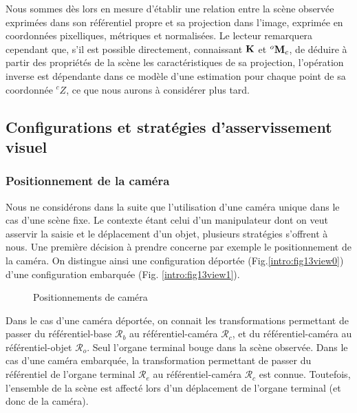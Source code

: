 Nous sommes dès lors en mesure d'établir une relation entre la scène observée 
exprimées dans son référentiel propre et sa projection dans l'image, exprimée 
en 
coordonnées pixelliques, métriques et normalisées. Le lecteur 
remarquera cependant que, s'il est possible directement, connaissant ${\bf K}$ 
et ${}^o{\bf M}_c$, de déduire à partir des propriétés de la scène les 
caractéristiques de sa projection, l'opération inverse est dépendante dans ce 
modèle d'une estimation pour chaque point de sa coordonnée ${}^cZ$, ce que nous 
aurons à considérer plus tard.

\subsection{Configurations et stratégies d'asservissement visuel} 
\label{chap0-3-1}

\subsubsection{Positionnement de la caméra} \label{chap0-3-1-0}

Nous ne considérons dans la suite que l'utilisation d'une caméra unique dans le 
cas d'une scène fixe. Le contexte étant celui d'un manipulateur dont on veut 
asservir la saisie et le déplacement d'un objet, plusieurs stratégies s'offrent 
à nous. Une première décision à prendre concerne par exemple le positionnement 
de la caméra. On distingue ainsi une configuration déportée 
(Fig.\ref{intro:fig13view0}) d'une configuration embarquée (Fig. 
\ref{intro:fig13view1}).

\begin{figure}[htp]
  \centering
   \hfill
    \caption{\footnotesize{Positionnements de caméra}}
\label{intro:fig13}
\end{figure}

Dans le cas d'une caméra déportée, on connait les transformations permettant de 
passer du référentiel-base $\mathcal R_b$ au référentiel-caméra $\mathcal R_c$, 
et du référentiel-caméra au référentiel-objet $\mathcal R_o$. Seul l'organe 
terminal bouge dans la scène observée. Dans le cas d'une caméra embarquée, la 
transformation permettant de passer du référentiel de l'organe terminal 
$\mathcal R_e$ au référentiel-caméra $\mathcal R_c$ est connue. Toutefois, 
l'ensemble de la scène est affecté lors d'un déplacement de l'organe terminal 
(et donc de la caméra).

